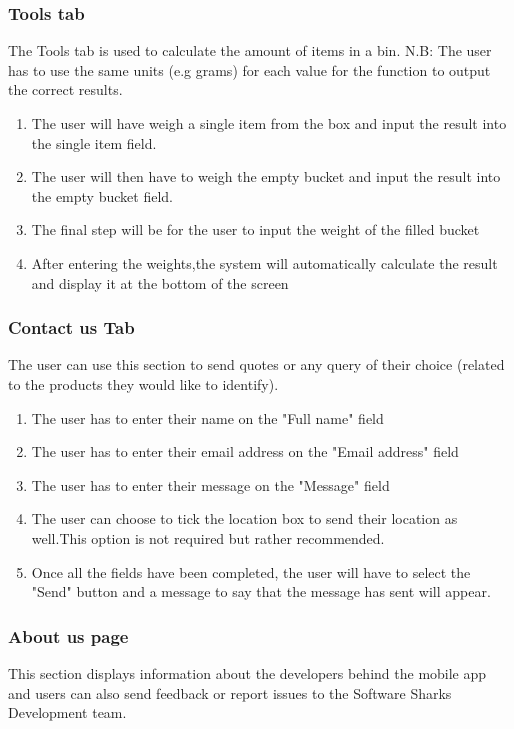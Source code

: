 \documentclass[a4paper, 12pt]{article}
\begin{document}
\subsubsection{Tools tab}
The Tools tab is used to calculate the amount of items in a bin.\newline
N.B: The user has to use the same units (e.g grams) for each value for the function to output the correct results. 
\begin{enumerate}
\item The user will have weigh a single item from the box and input the result into the single item field.
\item The user will then have to weigh the empty bucket and input the result into the empty bucket field.
\item The final step will be for the user to input the weight of the filled bucket
\item After entering the weights,the system will automatically calculate the result and display it at the bottom of the screen
\end{enumerate}

\subsubsection{Contact us Tab}
The user can use this section to send quotes or any query of their choice (related to the products they would like to identify).
\newline
\begin{enumerate}
\item The user has to enter their name on the "Full name" field
\item The user has to enter their email address on the "Email address" field
\item The user has to enter their message on the "Message" field
\item The user can choose to tick the location box to send their location as well.This option is not required but rather recommended. 
\item Once all the fields have been completed, the user will have to select the "Send" button and a message to say that the message has sent will appear.
\end{enumerate}



\subsubsection{About us page}
This section displays information about the developers behind the mobile app and users can also send feedback or report issues to the Software Sharks Development team.
\end{document}
